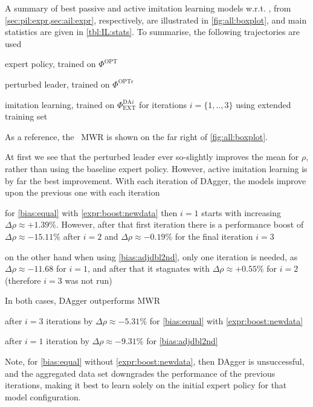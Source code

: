 \documentclass[smallextended]{svjour3}
\begin{document}
A summary of  best passive and active imitation learning models
w.r.t. \namerho, from 
\cref{sec:pil:expr,sec:ail:expr}, respectively, are illustrated in 
\cref{fig:all:boxplot}, and main statistics are given in 
\cref{tbl:IL:stats}. To summarise, the following trajectories are used
\begin{enumerate*}
  \item expert policy, trained on $\Phi^{\text{OPT}}$
  \item perturbed leader, trained on $\Phi^{\text{OPT}\epsilon}$
  \item imitation learning, trained on $\Phi^{\text{DA}i}_{\text{EXT}}$ for 
  iterations $i=\{1,..,3\}$ using extended training set
\end{enumerate*}
As a reference, the \sdr\ MWR is shown on the far right of 
\cref{fig:all:boxplot}.

At first we see that the perturbed leader ever so-slightly improves the mean 
for $\rho$, rather than using the baseline expert policy. 
However, active imitation learning is by far the best improvement. With each 
iteration of DAgger, the models improve upon the previous one with each 
iteration
\begin{enumerate*}  
  \item for \ref{bias:equal} with \ref{expr:boost:newdata} then $i=1$ starts 
  with increasing  $\Delta\rho\approx+1.39\%$. However, after that first 
  iteration there is a performance boost of $\Delta\rho\approx-15.11\%$ after 
  $i=2$ and $\Delta\rho\approx-0.19\%$ for the final iteration $i=3$
  \item on the other hand when using \ref{bias:adjdbl2nd}, only one iteration 
  is needed, as  $\Delta\rho\approx-11.68$ for $i=1$, and after that it 
  stagnates with $\Delta\rho\approx+0.55\%$ for $i=2$ 
  (therefore $i=3$ was not run)
\end{enumerate*}
In both cases, DAgger outperforms MWR
\begin{enumerate*}
  \item after $i=3$ iterations by $\Delta\rho\approx-5.31\%$ for 
  \ref{bias:equal} with \ref{expr:boost:newdata}
  \item after $i=1$ iteration by $\Delta\rho\approx-9.31\%$ for 
  \ref{bias:adjdbl2nd}
\end{enumerate*}
Note, for \ref{bias:equal} without \ref{expr:boost:newdata}, then DAgger is 
unsuccessful, and the aggregated data set downgrades the performance of the 
previous iterations, making it best to learn solely on the initial expert 
policy for that model configuration.
\end{document}

